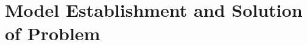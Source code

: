 \pagestyle{fancy}
\section{Model Establishment and Solution of Problem}
    
    
    
    
    
    